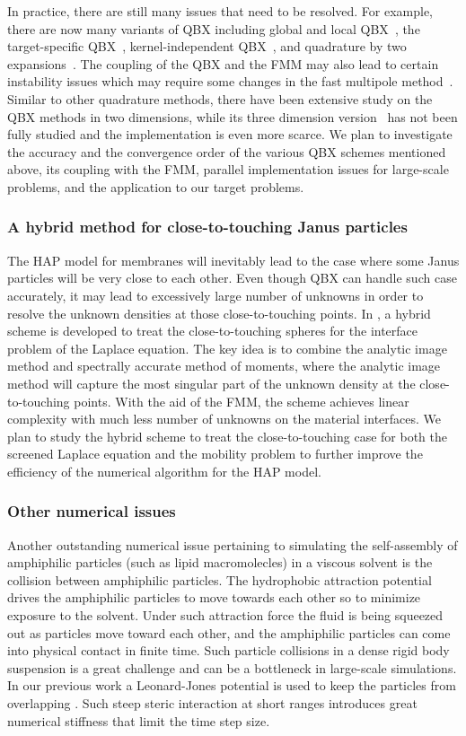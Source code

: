 In practice, there are still many issues that need to be resolved.
For example, there are now many variants of QBX including global and local
QBX~\cite{klockner2013jcp,rachh2017jcp}, the target-specific QBX~\cite{siegel2018jcp},
kernel-independent QBX~\cite{abtin2018bit}, and
quadrature by two expansions~\cite{ding2019arxiv}. The coupling of the QBX
and the FMM may also lead to certain instability issues which may require
some changes in the fast multipole method~\cite{wala2018jcp}. Similar
to other quadrature methods, there have been extensive study on the QBX
methods in two dimensions, while its three dimension
version~\cite{wala2019jcp,af2018sisc,siegel2018jcp,wala2019arxiv} has not been
fully studied and the implementation is even more scarce. We plan to investigate
the accuracy and the convergence order of the various QBX schemes mentioned above,
its coupling with the FMM, parallel implementation issues for large-scale
problems, and the application to our target problems.
\subsubsection{A hybrid method for close-to-touching Janus particles}
The HAP model for membranes will inevitably lead to the case where some Janus particles
will be very close to each other. Even though QBX can handle such case
accurately, it may lead to excessively large number of unknowns in order to resolve
the unknown densities at those close-to-touching points. In \cite{gan2016sisc},
a hybrid scheme is developed to treat the close-to-touching spheres for the interface
problem of the Laplace equation. The key idea is to combine the analytic image method
and spectrally accurate method of moments, where the analytic image method will capture
the most singular part of the unknown density at the close-to-touching points.
With the aid of the FMM, the scheme achieves linear complexity with much less number
of unknowns on the material interfaces.
We plan to study the hybrid scheme
to treat the close-to-touching case for both the screened Laplace equation and the
mobility problem to further improve the efficiency of the numerical algorithm
for the HAP model.
\subsubsection{Other numerical issues}
Another outstanding numerical issue pertaining to simulating the self-assembly of amphiphilic particles (such as lipid macromolecles) in a
viscous solvent is the collision between amphiphilic particles.
The hydrophobic attraction potential drives the amphiphilic particles to move towards each other so to minimize exposure to the solvent. 
Under such
attraction force the fluid is being squeezed out as particles move toward each other, and the amphiphilic particles can come into physical
contact in finite time. 
Such particle collisions in a dense rigid body suspension is a great challenge and can be a bottleneck in large-scale simulations. 
In our previous work a Leonard-Jones potential is used to keep the
particles from overlapping \cite{Fu2018_SIAM}. 
Such steep steric interaction at
short ranges introduces great numerical stiffness that limit the time step size. 

